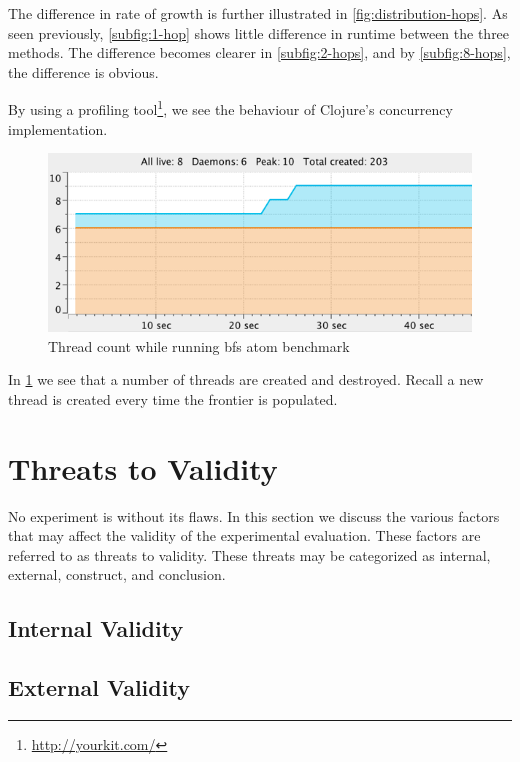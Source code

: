 				
				The difference in rate of growth is further illustrated in \cref{fig:distribution-hops}.  As seen previously, \cref{subfig:1-hop} shows little difference in runtime between the three methods.  The difference becomes clearer in \cref{subfig:2-hops}, and by \cref{subfig:8-hops}, the difference is obvious.
				
				By using a profiling tool\footnote{\url{http://yourkit.com/}}, we see the behaviour of Clojure's concurrency implementation.
				
				\begin{figure}
					\centering
					
					\includegraphics{figures/images/threads}
					
					\caption{Thread count while running \gls{bfs} atom benchmark}
					\label{fig:runtime-threads}
				\end{figure}
				
				In \cref{fig:runtime-threads} we see that a number of threads are created and destroyed.  Recall a new thread is created every time the frontier is populated.
	
	\section{Threats to Validity}
		No experiment is without its flaws.  In this section we discuss the various factors that may affect the validity of the experimental evaluation.  These factors are referred to as threats to validity.  These threats may be categorized as internal, external, construct, and conclusion.
		
		\subsection{Internal Validity}
		\label{sec:internal-validity}
			
		
		\subsection{External Validity}
		\label{sec:external-validity}
			
